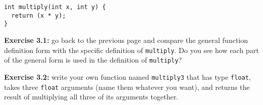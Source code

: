 \documentclass[
]{leaflet}
\begin{document}
\begin{lstlisting}
int multiply(int x, int y) {
  return (x * y);
}
\end{lstlisting}

\textbf{Exercise 3.1:} go back to the previous page and compare the general function definition form with the specific definition of \texttt{multiply}.
Do you see how each part of the general form is used in the definition of \texttt{multiply}?

\textbf{Exercise 3.2:} write your own function named \texttt{multiply3} that has type \texttt{float}, takes three \texttt{float} arguments (name them whatever you want), and returns the result of multiplying all three of its arguments together.


\loggingall
\end{document}
